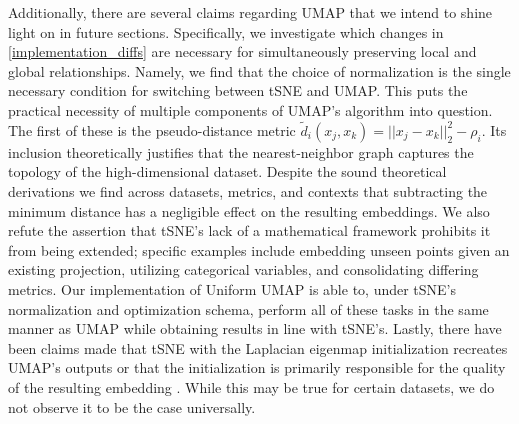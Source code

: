 \documentclass{article}
\theoremstyle{definition}
\begin{document}
Additionally, there are several claims regarding UMAP that we intend to shine light on in future sections. Specifically, we investigate which changes in 
\ref{implementation_diffs} are necessary for simultaneously preserving local and global relationships. Namely, we find that the choice of normalization is the
single necessary condition for switching between tSNE and UMAP.
This puts the practical necessity of multiple components of UMAP's algorithm into question. The first of these is the pseudo-distance metric $\tilde{d}_i(x_j, x_k) = ||x_j - x_k||_2^2
- \rho_i$. Its inclusion theoretically justifies that the nearest-neighbor graph captures the topology of the high-dimensional dataset. Despite the sound
theoretical derivations we find across datasets, metrics, and contexts that subtracting the minimum distance has a negligible effect on the resulting
embeddings. We also refute the assertion that tSNE's lack of a mathematical framework prohibits it from being
extended; specific examples include embedding unseen
points given an existing projection, utilizing categorical variables, and consolidating differing metrics. Our implementation of Uniform UMAP is able
to, under tSNE's normalization and optimization schema, perform all of these tasks in the same manner as UMAP while obtaining results in line with tSNE's. Lastly, there have been claims made that tSNE
with the Laplacian eigenmap initialization recreates UMAP's outputs \cite{kobak2019umap} or that the initialization is primarily responsible for the quality of
the resulting embedding \cite{kobak2021initialization}. While this may be true for certain datasets, we do not observe it to be the case universally.
\end{document}
